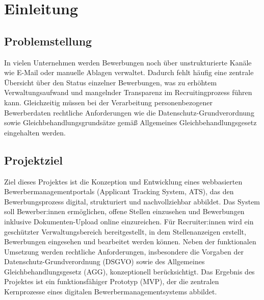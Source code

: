 \section{Einleitung}
\subsection{Problemstellung}
In vielen Unternehmen werden Bewerbungen noch über unstrukturierte Kanäle wie E-Mail oder manuelle Ablagen verwaltet. 
Dadurch fehlt häufig eine zentrale Übersicht über den Status einzelner Bewerbungen, was zu erhöhtem Verwaltungsaufwand und mangelnder Transparenz im Recruitingprozess führen kann. 
Gleichzeitig müssen bei der Verarbeitung personenbezogener Bewerberdaten rechtliche Anforderungen wie die Datenschutz-Grundverordnung sowie Gleichbehandlungsgrundsätze gemäß Allgemeines Gleichbehandlungsgesetz eingehalten werden. 

\subsection{Projektziel}
Ziel dieses Projektes ist die Konzeption und Entwicklung eines webbasierten Bewerbermanagementportals (Applicant Tracking System, ATS), das den Bewerbungsprozess digital, strukturiert und nachvollziehbar abbildet. 
Das System soll Bewerber:innen ermöglichen, offene Stellen einzusehen und Bewerbungen inklusive Dokumenten-Upload online einzureichen. 
Für Recruiter:innen wird ein geschützter Verwaltungsbereich bereitgestellt, in dem Stellenanzeigen erstellt, Bewerbungen eingesehen und bearbeitet werden können.
Neben der funktionalen Umsetzung werden rechtliche Anforderungen, insbesondere die Vorgaben der Datenschutz-Grundverordnung (DSGVO) sowie des Allgemeines Gleichbehandlungsgesetz (AGG), konzeptionell berücksichtigt.
Das Ergebnis des Projektes ist ein funktionsfähiger Prototyp (MVP), der die zentralen Kernprozesse eines digitalen Bewerbermanagementsystems abbildet.
